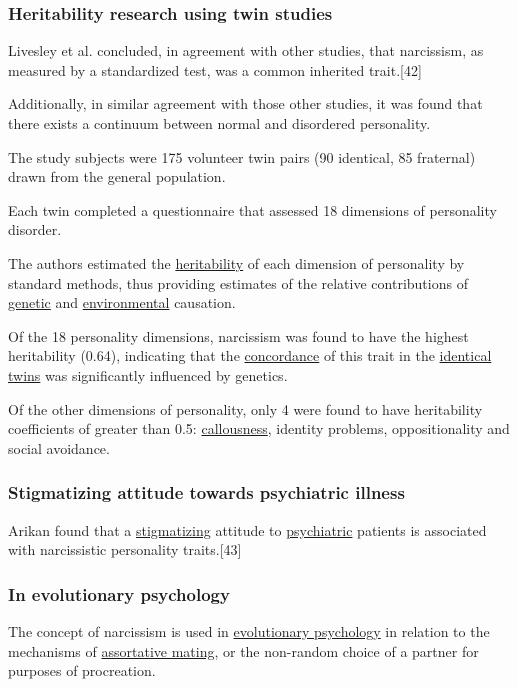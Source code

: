 \documentclass[oneside]{book}
\numberwithin{equation}{section}
\begin{document}
\subsubsection{Heritability research using twin studies}
Livesley et al. concluded, in agreement with other studies, that narcissism, as measured by a standardized test, was a common inherited trait.[42]

Additionally, in similar agreement with those other studies, it was found that there exists a continuum between normal and disordered personality.

The study subjects were 175 volunteer twin pairs (90 identical, 85 fraternal) drawn from the general population.

Each twin completed a questionnaire that assessed 18 dimensions of personality disorder.

The authors estimated the \href{https://en.wikipedia.org/wiki/Heritability}{heritability} of each dimension of personality by standard methods, thus providing estimates of the relative contributions of \href{https://en.wikipedia.org/wiki/Genetics}{genetic} and \href{https://en.wikipedia.org/wiki/Natural_environment}{environmental} causation.
    
Of the 18 personality dimensions, narcissism was found to have the highest heritability (0.64), indicating that the \href{https://en.wikipedia.org/wiki/Concordance_(genetics)}{concordance} of this trait in the \href{https://en.wikipedia.org/wiki/Identical_twins}{identical twins} was significantly influenced by genetics.

Of the other dimensions of personality, only 4 were found to have heritability coefficients of greater than 0.5: \href{https://en.wikipedia.org/wiki/Callous_and_unemotional_traits}{callousness}, identity problems, oppositionality and social avoidance.

\subsubsection{Stigmatizing attitude towards psychiatric illness}
Arikan found that a \href{https://en.wikipedia.org/wiki/Social_stigma}{stigmatizing} attitude to \href{https://en.wikipedia.org/wiki/Psychiatric}{psychiatric} patients is associated with narcissistic personality traits.[43]

\subsubsection{In evolutionary psychology}
The concept of narcissism is used in \href{https://en.wikipedia.org/wiki/Evolutionary_psychology}{evolutionary psychology} in relation to the mechanisms of \href{https://en.wikipedia.org/wiki/Assortative_mating}{assortative mating}, or the non-random choice of a partner for purposes of procreation.
\end{document}
